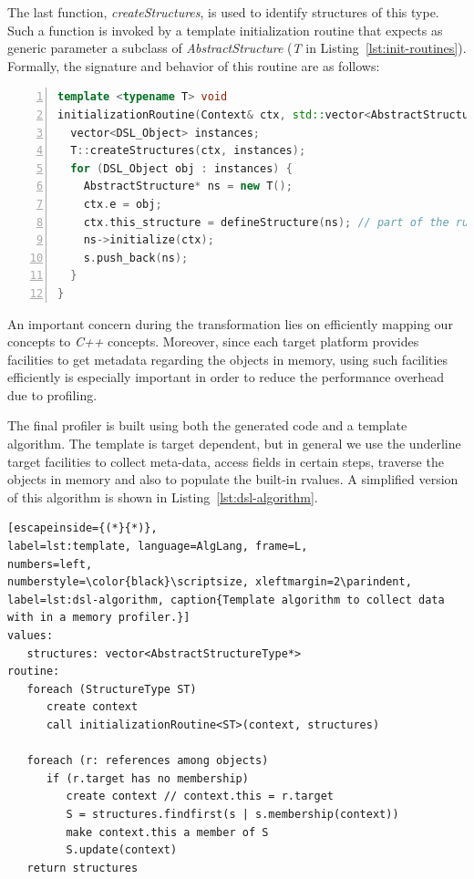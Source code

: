 The last function, \textit{createStructures}, is used to identify structures of this type.
Such a function is invoked by a template initialization routine that expects as generic parameter a subclass of 
\textit{AbstractStructure} (\textit{T} in Listing~\ref{lst:init-routines}).
Formally, the signature and behavior of this routine are as follows:
\begin{lstlisting}[language=C++, frame=L,
numbers=left,
numberstyle=\color{black}\scriptsize,xleftmargin=2\parindent,
label=lst:init-routines, caption={Routine to initialize structures in the heap.}]
template <typename T> void
initializationRoutine(Context& ctx, std::vector<AbstractStructure*>& s){
  vector<DSL_Object> instances;
  T::createStructures(ctx, instances);
  for (DSL_Object obj : instances) {
    AbstractStructure* ns = new T();
    ctx.e = obj;
    ctx.this_structure = defineStructure(ns); // part of the runtime support
    ns->initialize(ctx);
    s.push_back(ns);
  }
}
\end{lstlisting}
An important concern during the transformation lies on efficiently mapping our concepts to \textit{C++} concepts.
Moreover, since each target platform provides facilities to get metadata regarding the objects in memory, using such facilities efficiently is especially important in order to reduce the performance overhead due to profiling.

The final profiler is built using both the generated code and a template algorithm.
The template is target dependent, but in general we use the underline target facilities to collect meta-data, access fields in certain steps, traverse the objects in memory and also to populate the built-in rvalues.
A simplified version of this algorithm is shown in Listing~\ref{lst:dsl-algorithm}.

\begin{lstlisting}[escapeinside={(*}{*)},
label=lst:template, language=AlgLang, frame=L,
numbers=left,
numberstyle=\color{black}\scriptsize, xleftmargin=2\parindent,
label=lst:dsl-algorithm, caption{Template algorithm to collect data with in a memory profiler.}]
values:
   structures: vector<AbstractStructureType*>
routine:
   foreach (StructureType ST)
	  create context
	  call initializationRoutine<ST>(context, structures)
   
   foreach (r: references among objects)
      if (r.target has no membership)
         create context // context.this = r.target
         S = structures.findfirst(s | s.membership(context))
         make context.this a member of S
         S.update(context)
   return structures 
\end{lstlisting}

